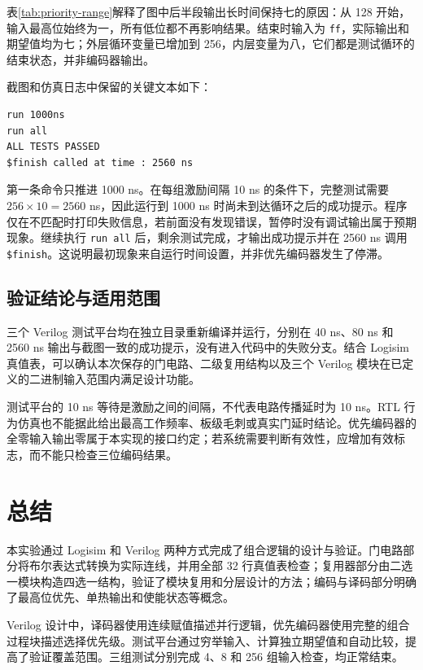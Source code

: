 \documentclass[12pt,a4paper,fontset=fandol]{ctexart}
\begin{document}
表\ref{tab:priority-range}解释了图中后半段输出长时间保持七的原因：从 128 开始，输入最高位始终为一，所有低位都不再影响结果。结束时输入为 \texttt{ff}，实际输出和期望值均为七；外层循环变量已增加到 256，内层变量为八，它们都是测试循环的结束状态，并非编码器输出。

截图和仿真日志中保留的关键文本如下：
\begin{lstlisting}[language={},numbers=none,caption={优先编码器从默认运行时长继续至正常结束}]
run 1000ns
run all
ALL TESTS PASSED
$finish called at time : 2560 ns
\end{lstlisting}

第一条命令只推进 1000 ns。在每组激励间隔 10 ns 的条件下，完整测试需要 $256\times10=2560$ ns，因此运行到 1000 ns 时尚未到达循环之后的成功提示。程序仅在不匹配时打印失败信息，若前面没有发现错误，暂停时没有调试输出属于预期现象。继续执行 \texttt{run all} 后，剩余测试完成，才输出成功提示并在 2560 ns 调用 \texttt{\$finish}。这说明最初现象来自运行时间设置，并非优先编码器发生了停滞。

\subsection{验证结论与适用范围}

三个 Verilog 测试平台均在独立目录重新编译并运行，分别在 40 ns、80 ns 和 2560 ns 输出与截图一致的成功提示，没有进入代码中的失败分支。结合 Logisim 真值表，可以确认本次保存的门电路、二级复用结构以及三个 Verilog 模块在已定义的二进制输入范围内满足设计功能。

测试平台的 10 ns 等待是激励之间的间隔，不代表电路传播延时为 10 ns。RTL 行为仿真也不能据此给出最高工作频率、板级毛刺或真实门延时结论。优先编码器的全零输入输出零属于本实现的接口约定；若系统需要判断有效性，应增加有效标志，而不能只检查三位编码结果。

\section{总结}

本实验通过 Logisim 和 Verilog 两种方式完成了组合逻辑的设计与验证。门电路部分将布尔表达式转换为实际连线，并用全部 32 行真值表检查；复用器部分由二选一模块构造四选一结构，验证了模块复用和分层设计的方法；编码与译码部分明确了最高位优先、单热输出和使能状态等概念。

Verilog 设计中，译码器使用连续赋值描述并行逻辑，优先编码器使用完整的组合过程块描述选择优先级。测试平台通过穷举输入、计算独立期望值和自动比较，提高了验证覆盖范围。三组测试分别完成 4、8 和 256 组输入检查，均正常结束。
\end{document}
